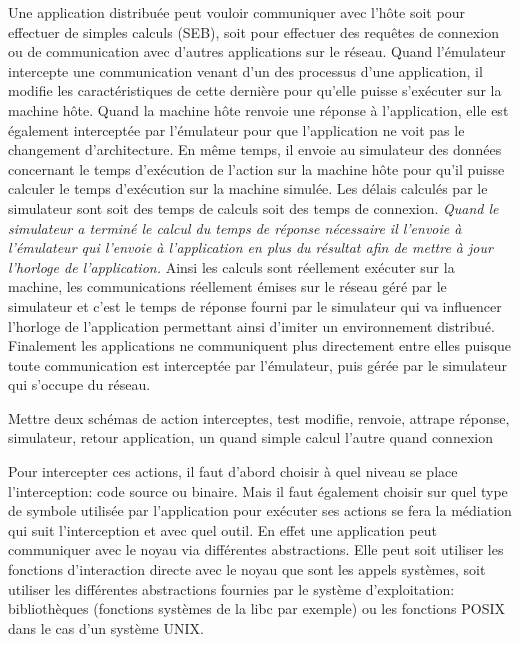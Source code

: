  Une application distribuée peut vouloir communiquer avec l'hôte soit pour
 effectuer de simples calculs (SEB), soit pour effectuer des requêtes de
 connexion ou de communication avec d'autres applications sur le réseau. Quand
 l'émulateur intercepte une communication venant d'un des processus d'une
 application, il modifie les caractéristiques de cette dernière pour qu'elle
 puisse s'exécuter sur la machine hôte. Quand la machine hôte renvoie une
 réponse à l'application, elle est également interceptée par l'émulateur pour
 que l'application ne voit pas le changement d'architecture. En même temps, il
 envoie au simulateur des données concernant le temps d'exécution de l'action
 sur la machine hôte pour qu'il puisse calculer le temps d'exécution sur la machine simulée. Les délais
 calculés par le simulateur sont soit des temps de calculs soit des temps de
 connexion. \textit{Quand le simulateur a terminé le calcul du temps de réponse
 nécessaire il l'envoie à l'émulateur qui l'envoie à l'application en plus du résultat afin de mettre à
 jour l'horloge de l'application.} Ainsi les calculs sont réellement exécuter
 sur la machine, les communications réellement émises sur le réseau géré par le
 simulateur et c'est le temps de réponse fourni par le simulateur qui va
 influencer l'horloge de l'application permettant ainsi d'imiter un
 environnement distribué. Finalement les applications ne communiquent plus
 directement entre elles puisque toute communication est interceptée par
 l'émulateur, puis gérée par le simulateur qui s'occupe du réseau.

{\color{red} Mettre deux schémas de action interceptes, test modifie, renvoie,
  attrape réponse, simulateur, retour application, un quand simple calcul l'autre quand connexion}

Pour intercepter ces actions, il faut d'abord choisir à quel niveau se place
l'interception: code source ou binaire. Mais il faut également choisir sur quel
type de symbole utilisée par l'application pour exécuter ses actions se fera la
médiation qui suit l'interception et avec quel outil. En effet une application
peut communiquer avec le noyau via différentes abstractions. Elle peut soit
utiliser les fonctions d'interaction directe avec le noyau que sont les appels
systèmes, soit utiliser les différentes abstractions fournies par le système
d'exploitation: bibliothèques (fonctions systèmes de la libc par exemple) ou les
fonctions POSIX dans le cas d'un système UNIX.

